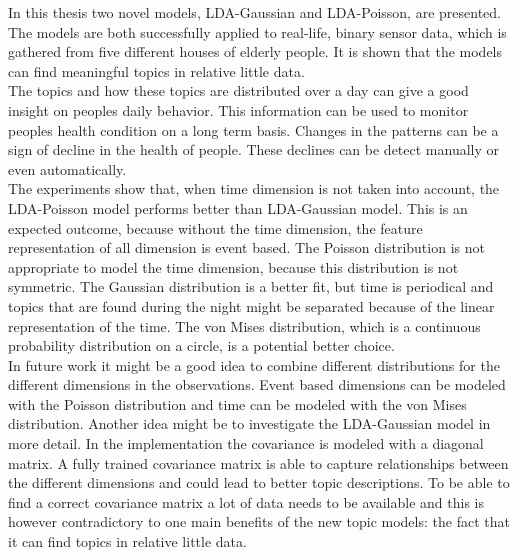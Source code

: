 In this thesis two novel models, LDA-Gaussian and LDA-Poisson, are presented. The models are both successfully applied to real-life, binary  sensor data, which is gathered from five different houses of elderly people. It is shown that the models can find meaningful topics in relative little data.\\

The topics and how these topics are distributed over a day can give a good insight on peoples daily behavior. This information can be used to monitor peoples health condition on a long term basis. Changes in the patterns can be a sign of decline in the health of people. These declines can be detect manually or even automatically.\\

The experiments show that, when time dimension is not taken into account, the LDA-Poisson model performs better than LDA-Gaussian model. This is an expected outcome, because without the time dimension, the feature representation of all dimension is event based. The Poisson distribution is not appropriate to model the time dimension, because this distribution is not symmetric. The Gaussian distribution is a better fit, but time is periodical and topics that are found during the night might be separated because of the linear representation of the time. The von Mises distribution, which is a continuous probability distribution on a circle, is a potential better choice.\\

In future work it might be a good idea to combine different distributions for the different dimensions in the observations. Event based dimensions can be modeled with the Poisson distribution and time can be modeled with the von Mises distribution.
Another idea might be to investigate the LDA-Gaussian model in more detail. In the implementation the covariance is modeled with a diagonal matrix. A fully trained covariance matrix is able to capture relationships between the different dimensions and could lead to better topic descriptions. To be able to find a correct covariance matrix a lot of data needs to be available and this is however contradictory to one main benefits of the new topic models: the fact that it can find topics in relative little data. \\

